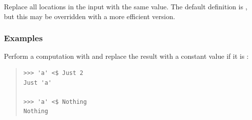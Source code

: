 \begin{haddockdesc}
{\begin{haddockdesc}
{\begin{quote}
{\begin{verbatim}
\end{verbatim}}
\end{quote}}
\end{haddockdesc}
\begin{haddockdesc}
\item[\begin{tabular}{@{}l}
(<{\char '44}) :: a -> f b -> f a
\end{tabular}]
{\haddockbegindoc
Replace all locations in the input with the same value.
 The default definition is , but this may be
 overridden with a more efficient version.\par
\subsubsection*{\textbf{Examples}}
Perform a computation with  and replace the result with a
 constant value if it is :\par
\begin{quote}
{\haddockverb\begin{verbatim}
>>> 'a' <$ Just 2
Just 'a'

>>> 'a' <$ Nothing
Nothing

\end{verbatim}}
\end{quote}}
\end{haddockdesc}}
\end{haddockdesc}
\begin{haddockdesc}
\item[\begin{tabular}{@{}l}
instance Functor Complex\\instance Functor IO\\instance Functor Maybe\\instance Functor {[}{]}\\instance Functor Array i\\instance Functor -> r\\\end{tabular}]
\end{haddockdesc}
